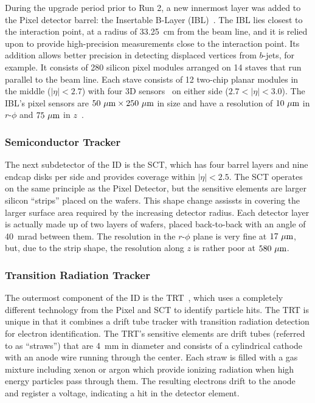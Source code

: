During the upgrade period prior to Run 2, a new innermost layer was added to the Pixel detector barrel: the Insertable B-Layer (IBL)~\cite{2010.ibl-tdr}.
The IBL lies closest to the interaction point, at a radius of 33.25~cm from the beam line, and it is relied upon to provide high-precision measurements close to the interaction point.
Its addition allows better precision in detecting displaced vertices from $b$-jets, for example.
It consists of 280 silicon pixel modules arranged on 14 staves that run parallel to the beam line.
Each stave consists of 12 two-chip planar modules in the middle ($|\eta| < 2.7$) with four 3D sensors~\cite{2015.ibl-3d} on either side ($2.7 < |\eta| < 3.0$).
The IBL's pixel sensors are $50~\mu\textrm{m}\times 250~\mu\textrm{m}$ in size and have a resolution of $10~\mu\textrm{m}$ in $r$-$\phi$ and $75~\mu\textrm{m}$ in $z$~\cite{2016.ibl-resolution}.

\subsubsection{Semiconductor Tracker} \label{sec:sct}
The next subdetector of the ID is the SCT, which has four barrel layers and nine endcap disks per side and provides coverage within $|\eta| < 2.5$.
The SCT operates on the same principle as the Pixel Detector, but the sensitive elements are larger silicon ``strips'' placed on the wafers.
This shape change assissts in covering the larger surface area required by the increasing detector radius.
Each detector layer is actually made up of two layers of wafers, placed back-to-back with an angle of 40~mrad between them.
The resolution in the $r$-$\phi$ plane is very fine at $17~\mu\textrm{m}$, but, due to the strip shape, the resolution along $z$ is rather poor at $580~\mu\textrm{m}$.

\subsubsection{Transition Radiation Tracker} \label{sec:trt}
The outermost component of the ID is the TRT~\cite{2008.trt-tubes, 2008.trt-barrel, 2008.trt-endcap}, which uses a completely different technology from the Pixel and SCT to identify particle hits.
The TRT is unique in that it combines a drift tube tracker with transition radiation detection for electron identification.
The TRT's sensitive elements are drift tubes (referred to as ``straws'') that are 4~mm in diameter and consists of a cylindrical cathode with an anode wire running through the center.
Each straw is filled with a gas mixture including xenon or argon which provide ionizing radiation when high energy particles pass through them.
The resulting electrons drift to the anode and register a voltage, indicating a hit in the detector element.

